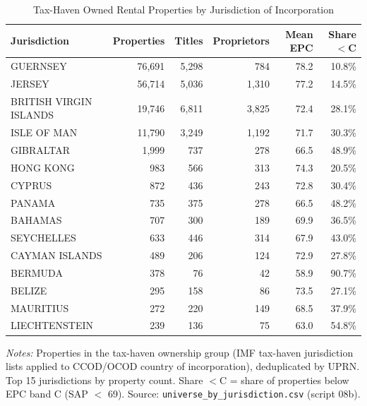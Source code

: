 \begin{table}[htbp]
\centering
\caption{Tax-Haven Owned Rental Properties by Jurisdiction of Incorporation}
\label{tab:offshore_universe_jurisdiction}
\small
\begin{tabular}{lrrrrr}
\toprule
Jurisdiction & Properties & Titles & Proprietors & Mean EPC & Share $<$C \\
\midrule
GUERNSEY & 76,691 & 5,298 & 784 & 78.2 & 10.8\% \\
JERSEY & 56,714 & 5,036 & 1,310 & 77.2 & 14.5\% \\
BRITISH VIRGIN ISLANDS & 19,746 & 6,811 & 3,825 & 72.4 & 28.1\% \\
ISLE OF MAN & 11,790 & 3,249 & 1,192 & 71.7 & 30.3\% \\
GIBRALTAR & 1,999 & 737 & 278 & 66.5 & 48.9\% \\
HONG KONG & 983 & 566 & 313 & 74.3 & 20.5\% \\
CYPRUS & 872 & 436 & 243 & 72.8 & 30.4\% \\
PANAMA & 735 & 375 & 278 & 66.5 & 48.2\% \\
BAHAMAS & 707 & 300 & 189 & 69.9 & 36.5\% \\
SEYCHELLES & 633 & 446 & 314 & 67.9 & 43.0\% \\
CAYMAN ISLANDS & 489 & 206 & 124 & 72.9 & 27.8\% \\
BERMUDA & 378 & 76 & 42 & 58.9 & 90.7\% \\
BELIZE & 295 & 158 & 86 & 73.5 & 27.1\% \\
MAURITIUS & 272 & 220 & 149 & 68.5 & 37.9\% \\
LIECHTENSTEIN & 239 & 136 & 75 & 63.0 & 54.8\% \\
\bottomrule
\end{tabular}
\begin{minipage}{0.9\textwidth}
\vspace{4pt}
\footnotesize
\textit{Notes:} Properties in the tax-haven ownership group (IMF tax-haven
jurisdiction lists applied to CCOD/OCOD country of incorporation), deduplicated
by UPRN. Top 15 jurisdictions by property count. Share $<$C = share of properties
below EPC band C (SAP $<$ 69). Source: \texttt{universe\_by\_jurisdiction.csv} (script 08b).
\end{minipage}
\end{table}

